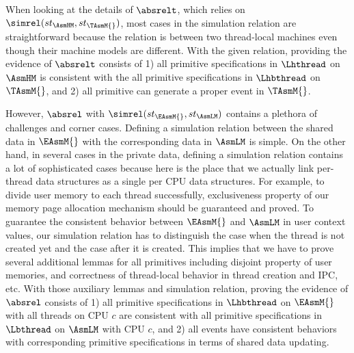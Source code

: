 When looking at the details of $\absrelt$, which relies on $\simrel(st_{\AsmHM}, st_{\TAsmM{}})$,
most cases in the simulation relation are straightforward because 
the relation is between two thread-local machines even though their machine models are different. 
With the given relation, providing the evidence of $\absrelt$ consists of 
1) all primitive specifications in $\Lhthread$ on $\AsmHM$ is consistent with the all primitive specifications in 
$\Lhbthread$ on $\TAsmM{}$, and
2) all primitive can generate a proper event in $\TAsmM{}$. 

However, $\absrel$ with $\simrel(st_{\EAsmM{}}, st_{\AsmLM})$ contains a plethora of challenges and corner cases. 
Defining a simulation relation between the shared data in $\EAsmM{}$ with the corresponding data in $\AsmLM$ is simple. 
On the other hand, in several cases in the private data, defining a simulation relation 
contains a lot of sophisticated cases because here is the place that we actually link per-thread data structures as 
a single per CPU data structures.
For example, to divide user memory to each thread successfully, 
exclusiveness property of our memory page allocation mechanism should be guaranteed and proved. 
To guarantee the consistent behavior between 
 $\EAsmM{}$ and $\AsmLM$ in user context values, our simulation relation
has to distinguish the case when the thread is not created yet and the case after it is created.
This implies that we have to prove several additional lemmas for all primitives 
including  disjoint property of user memories, 
and correctness of thread-local behavior in thread creation and IPC, etc.
With those auxiliary lemmas and simulation relation, proving the evidence of $\absrel$ consists of 
1) all primitive specifications in $\Lhbthread$ on $\EAsmM{}$ with all threads on CPU $c$ are consistent with  all primitive specifications in $\Lbthread$ on $\AsmLM$ with CPU $c$, and
2) all events have consistent behaviors with corresponding primitive specifications in terms of shared data updating.

